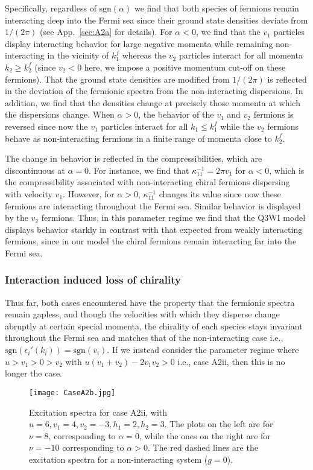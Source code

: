 \documentclass[aps,pra,
superscriptaddress,
reprint,twocolumn,preprintnumbers,
amsmath,amssymb,
nofootinbib]{revtex4-1}
\begin{document}
Specifically, regardless of $\text{sgn}(\alpha)$ we find that both species of fermions remain interacting deep into the Fermi sea since their ground state densities deviate from $1/(2\pi)$ (see App.~\ref{sec:A2a} for details). For $\alpha<0$, we find that the $v_1$ particles display interacting behavior for large negative momenta while remaining non-interacting in the vicinity of $k_1^f$ whereas the $v_2$ particles interact for all momenta $k_2 \geq k_2^f$ (since $v_2 < 0$ here, we impose a positive momentum cut-off on these fermions). That the ground state densities are modified from $1/(2\pi)$ is reflected in the deviation of the fermionic spectra from the non-interacting dispersions. In addition, we find that the densities change at precisely those momenta at which the dispersions change. When $\alpha > 0$, the behavior of the $v_1$ and $v_2$ fermions is reversed since now the $v_1$ particles interact for all $k_1 \leq k_1^f$ while the $v_2$ fermions behave as non-interacting fermions in a finite range of momenta close to $k_2^f$.

The change in behavior is reflected in the compressibilities, which are discontinuous at $\alpha = 0$. For instance, we find that $\kappa_{11}^{-1} = 2 \pi v_1$ for $\alpha < 0$, which is the compressibility associated with non-interacting chiral fermions dispersing with velocity $v_1$. However, for $\alpha > 0$, $\kappa_{11}^{-1}$ changes its value since now these fermions are interacting throughout the Fermi sea. Similar behavior is displayed by the $v_2$ fermions. Thus, in this parameter regime we find that the Q3WI model displays behavior starkly in contrast with that expected from weakly interacting fermions, since in our model the chiral fermions remain interacting far into the Fermi sea. 

\subsubsection*{Interaction induced loss of chirality}

Thus far, both cases encountered have the property that the fermionic spectra remain gapless, and though the velocities with which they disperse change abruptly at certain special momenta, the chirality of each species stays invariant throughout the Fermi sea and matches that of the non-interacting case i.e., $\text{sgn}\left(\epsilon_i'(k_i)\right) = \text{sgn}(v_i)$. If we instead consider the parameter regime where $u>v_1>0>v_2$ with $u(v_1 + v_2) -2 v_1 v_2 > 0$ i.e., case A2ii, then this is no longer the case.
	\begin{figure}[t]
    \texttt{[image: CaseA2b.jpg]}
    \centering
    \caption{\label{fig:03} Excitation spectra for case A2ii, with $u = 6,v_1 = 4,v_2 = -3,h_1 = 2,h_2 = 3$. The plots on the left are for $\nu = 8$, corresponding to $\alpha=0$, while the ones on the right are for $\nu = -10$ corresponding to $\alpha>0$. The red dashed lines are the excitation spectra for a non-interacting system ($g = 0$).}
    \end{figure}
    
\end{document}
